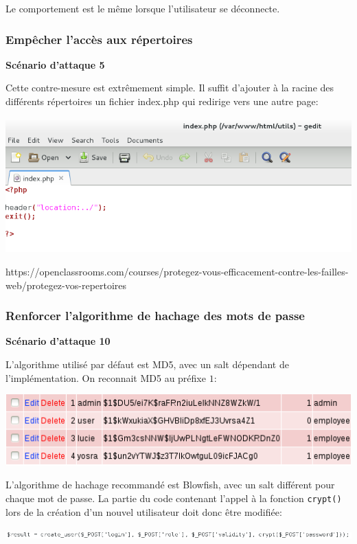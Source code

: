 \documentclass{article}
\begin{document}
Le comportement est le même lorsque l'utilisateur se déconnecte.

\subsubsection{Empêcher l'accès aux répertoires}

\textbf{Scénario d'attaque 5}

Cette contre-mesure est extrêmement simple. Il suffit d'ajouter à la
racine des différents répertoires un fichier index.php qui redirige vers
une autre page:

\includegraphics[width=\textwidth]{images/repertoire_fix.PNG}

https://openclassrooms.com/courses/protegez-vous-efficacement-contre-les-failles-web/protegez-vos-repertoires

\subsubsection{Renforcer l'algorithme de hachage des mots de passe}

\textbf{Scénario d'attaque 10}

L'algorithme utilisé par défaut est MD5, avec un salt dépendant de
l'implémentation. On reconnait MD5 au préfixe \(1\):

\includegraphics[width=\textwidth]{images/crypt_avant.PNG}

L'algorithme de hachage recommandé est Blowfish, avec un salt différent
pour chaque mot de passe. La partie du code contenant l'appel à la
fonction \texttt{crypt()} lors de la création d'un nouvel utilisateur
doit donc être modifiée:

\includegraphics[width=\textwidth]{images/crypt_avant2.PNG}
\end{document}
